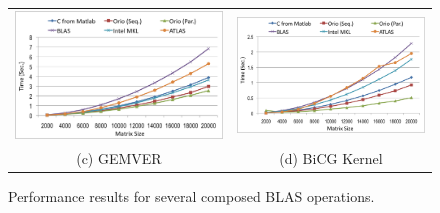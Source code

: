 \documentclass[runningheads]{llncs}
\begin{document}
\begin{figure}[htp]
{\begin{tabular}{cc}
\begin{minipage}[b]{.5\textwidth}
\includegraphics[width=\textwidth]{figures/gemver.png}
\end{minipage}
&
\begin{minipage}[b]{.5\textwidth}
\includegraphics[width=\textwidth]{figures/bicgkernel.png}
\end{minipage}\\

(c) GEMVER & (d) BiCG Kernel \\

\end{tabular}
}
\vspace{-.1in}
\caption{Performance results for several composed BLAS operations.}
\label{fig:results}
\vspace{-.1in}
\end{figure}
\end{document}
